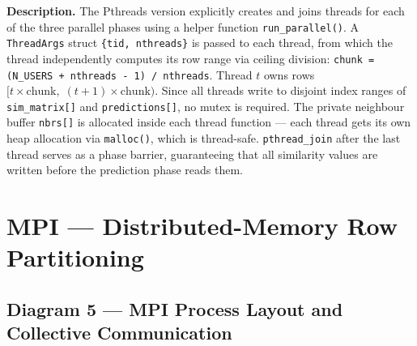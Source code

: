 \documentclass[12pt,a4paper]{article}
\begin{document}
\begin{center}
\end{center}

\begin{mdframed}[style=descbox]
\textbf{Description.}  The Pthreads version explicitly creates and joins
threads for each of the three parallel phases using a helper function
\texttt{run\_parallel()}.  A \texttt{ThreadArgs} struct
\texttt{\{tid, nthreads\}} is passed to each thread, from which the thread
independently computes its row range via ceiling division:
\texttt{chunk = (N\_USERS + nthreads - 1) / nthreads}.  Thread $t$ owns
rows $[t \times \text{chunk},\; (t+1) \times \text{chunk})$.  Since all
threads write to disjoint index ranges of \texttt{sim\_matrix[]} and
\texttt{predictions[]}, no mutex is required.  The private neighbour buffer
\texttt{nbrs[]} is allocated inside each thread function — each thread gets
its own heap allocation via \texttt{malloc()}, which is thread-safe.
\texttt{pthread\_join} after the last thread serves as a phase barrier,
guaranteeing that all similarity values are written before the prediction
phase reads them.
\end{mdframed}

\newpage

\section{MPI — Distributed-Memory Row Partitioning}

\subsection*{Diagram 5 — MPI Process Layout and Collective Communication}
\end{document}
